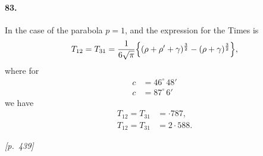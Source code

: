 \documentclass[11pt]{article}
\begin{document}
\paragraph{83.} In the case of the parabola $p = 1$, and the expression for the Times is
\[
T_{12} = T_{31} = \dfrac{1}{6\sqrt{\pi}}\Bigl\{(\rho + \rho' + \gamma)^{\frac{3}{2}} - (\rho + \gamma)^{\frac{3}{2}}\Bigr\},
\]
where for
\[
\begin{aligned}
c &= 46^{\circ}\,48'\\
c &= 87^{\circ}\,6'
\end{aligned}
\]
we have
\[
\begin{aligned}
T_{12} = T_{31} &= {\cdot}787,\\
T_{12} = T_{31} &= 2{\cdot}588.
\end{aligned}
\]

\medskip
\noindent\textit{[p.~439]}

\medskip
\end{document}

